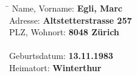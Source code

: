 \begin{tabbing}
\hspace*{4cm} \= \kill
Name, Vorname: \> {\bf Egli, Marc} \\
Adresse: \> {\bf Altstetterstrasse 257} \\
PLZ, Wohnort: \> {\bf 8048 Zürich} \\
\\
Geburtsdatum: \> {\bf 13.11.1983} \\
Heimatort: \> {\bf Winterthur} \\
\end{tabbing}